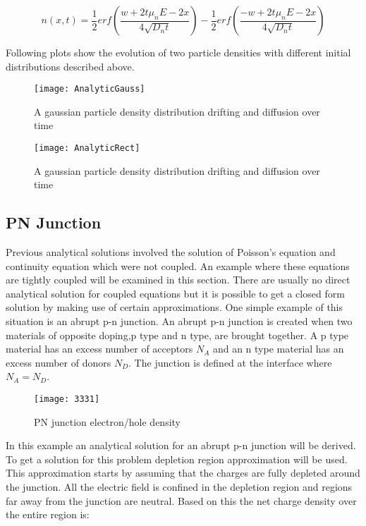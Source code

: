 \begin{doublespace}
\begin{equation}
n(x,t)=\frac{1}{2} erf(\frac{w+2t \mu_n E-2x}{4\sqrt{D_n t}})-\frac{1}{2}erf(\frac{-w+2t \mu_n E-2x}{4\sqrt{D_n t}}) 
\end{equation}

Following plots show the evolution of two particle densities with different initial distributions described above.

\begin{figure}[!htp]
\centering
\texttt{[image: AnalyticGauss]}
\caption{A gaussian particle density distribution drifting and diffusion over time} 
\end{figure}

\begin{figure}[!htp]
\centering
\texttt{[image: AnalyticRect]}
\caption{A gaussian particle density distribution drifting and diffusion over time} 
\end{figure}
\clearpage
\subsection{PN Junction}
Previous analytical solutions involved the solution of Poisson's equation and continuity equation which were not coupled. An example where these equations are tightly coupled will be examined in this section. There are usually no direct analytical solution for coupled equations but it is possible to get a closed form solution by making use of certain approximations. One simple example of this situation is an abrupt p-n junction. An abrupt p-n junction is created when two materials of opposite doping,p type and n type, are brought together. A p type material has an excess number of acceptors $N_A$ and an n type material has an excess number of donors $N_D$. The junction is defined at the interface where $N_A=N_D$. 

\begin{figure}[!htp]
\centering
\texttt{[image: 3331]}
\caption{PN junction electron/hole density} 
\end{figure}

In this example an analytical solution for an abrupt p-n junction will be derived. To get a solution for this problem depletion region approximation will be used. This approximation starts by assuming that the charges are fully depleted around the junction. All the electric field is confined in the depletion region and regions far away from the junction are neutral. Based on this the net charge density over the entire region is:


\end{doublespace}
